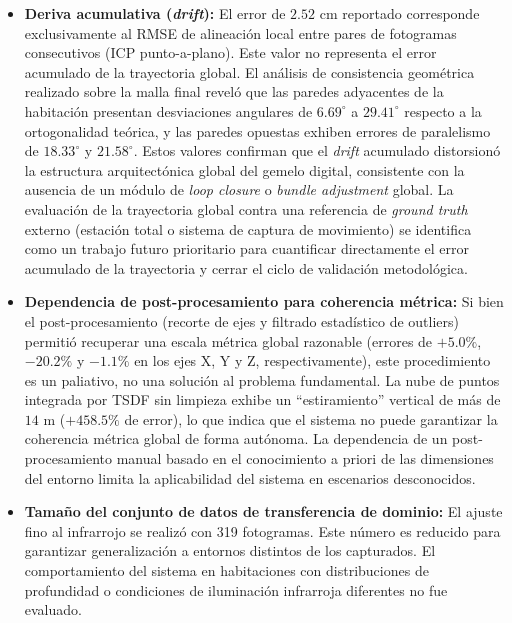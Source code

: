 \documentclass[12pt, a4, twoside, openany]{report}
\begin{document}
\begin{itemize}
    \item \textbf{Deriva acumulativa (\textit{drift}):} El error de $2.52$ cm reportado corresponde exclusivamente al RMSE de alineación local entre pares de fotogramas consecutivos (ICP punto-a-plano). Este valor no representa el error acumulado de la trayectoria global. El análisis de consistencia geométrica realizado sobre la malla final reveló que las paredes adyacentes de la habitación presentan desviaciones angulares de $6.69^{\circ}$ a $29.41^{\circ}$ respecto a la ortogonalidad teórica, y las paredes opuestas exhiben errores de paralelismo de $18.33^{\circ}$ y $21.58^{\circ}$. Estos valores confirman que el \textit{drift} acumulado distorsionó la estructura arquitectónica global del gemelo digital, consistente con la ausencia de un módulo de \textit{loop closure} o \textit{bundle adjustment} global. La evaluación de la trayectoria global contra una referencia de \textit{ground truth} externo (estación total o sistema de captura de movimiento) se identifica como un trabajo futuro prioritario para cuantificar directamente el error acumulado de la trayectoria y cerrar el ciclo de validación metodológica.

    \item \textbf{Dependencia de post-procesamiento para coherencia métrica:} Si bien el post-procesamiento (recorte de ejes y filtrado estadístico de outliers) permitió recuperar una escala métrica global razonable (errores de $+5.0\%$, $-20.2\%$ y $-1.1\%$ en los ejes X, Y y Z, respectivamente), este procedimiento es un paliativo, no una solución al problema fundamental. La nube de puntos integrada por TSDF sin limpieza exhibe un ``estiramiento'' vertical de más de $14$ m ($+458.5\%$ de error), lo que indica que el sistema no puede garantizar la coherencia métrica global de forma autónoma. La dependencia de un post-procesamiento manual basado en el conocimiento a priori de las dimensiones del entorno limita la aplicabilidad del sistema en escenarios desconocidos.

    \item \textbf{Tamaño del conjunto de datos de transferencia de dominio:} El ajuste fino al infrarrojo se realizó con 319 fotogramas. Este número es reducido para garantizar generalización a entornos distintos de los capturados. El comportamiento del sistema en habitaciones con distribuciones de profundidad o condiciones de iluminación infrarroja diferentes no fue evaluado.


\end{itemize}
\end{document}
